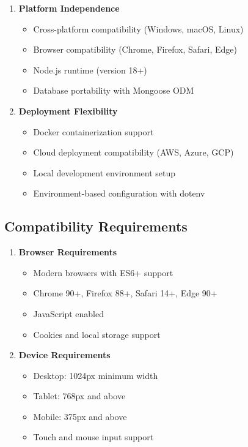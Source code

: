 \begin{enumerate}[leftmargin=*]
    \item \textbf{Platform Independence}
    \begin{itemize}
        \item Cross-platform compatibility (Windows, macOS, Linux)
        \item Browser compatibility (Chrome, Firefox, Safari, Edge)
        \item Node.js runtime (version 18+)
        \item Database portability with Mongoose ODM
    \end{itemize}
    
    \item \textbf{Deployment Flexibility}
    \begin{itemize}
        \item Docker containerization support
        \item Cloud deployment compatibility (AWS, Azure, GCP)
        \item Local development environment setup
        \item Environment-based configuration with dotenv
    \end{itemize}
\end{enumerate}

\subsection{Compatibility Requirements}

\begin{enumerate}[leftmargin=*]
    \item \textbf{Browser Requirements}
    \begin{itemize}
        \item Modern browsers with ES6+ support
        \item Chrome 90+, Firefox 88+, Safari 14+, Edge 90+
        \item JavaScript enabled
        \item Cookies and local storage support
    \end{itemize}
    
    \item \textbf{Device Requirements}
    \begin{itemize}
        \item Desktop: 1024px minimum width
        \item Tablet: 768px and above
        \item Mobile: 375px and above
        \item Touch and mouse input support
    \end{itemize}
\end{enumerate}
